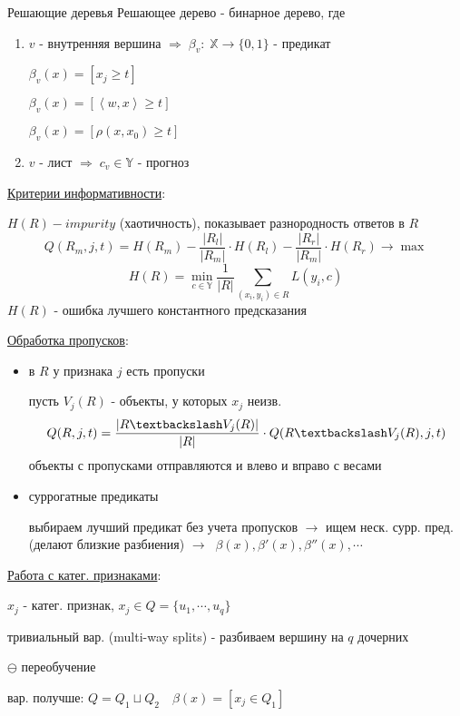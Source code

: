 \documentclass[final]{beamer}
\newlength{\colwidth}
\begin{document}
\begin{frame}[t]
\begin{columns}[t]
\begin{column}{\colwidth}
\begin{block}{Решающие деревья}
{\small Решающее дерево - бинарное дерево, где}
\begin{enumerate}
    \item $v$ - {\small внутренняя вершина } $\Rightarrow \; \beta_v: \; \mathbb{X} \to \{0, 1\}$ - {\small предикат}

$\beta_v(x) = [x_j \ge t]$

$\beta_v(x) = [\left< w, x \right> \ge t]$

$\beta_v(x) = [\rho(x, x_0) \ge t]$
    \item $v$ - {\small лист } $\Rightarrow \; c_v \in \mathbb{Y}$ - {\small прогноз}
\end{enumerate}
{\small \underline{Критерии информативности}:}

$H(R) - impurity$ {\small (хаотичность), показывает разнородность ответов в } $R$
\[Q(R_m, j, t) = H(R_m) - \frac{|R_l|}{|R_m|} \cdot H(R_l) - \frac{|R_r|}{|R_m|} \cdot H(R_r) \to \max\]
\[H(R) = \min\limits_{c \in \mathbb{Y}} \frac{1}{|R|} \sum\limits_{(x_i, y_i) \in R} L(y_i, c)\]
$H(R)$ - {\small ошибка лучшего константного предсказания}

{\small \underline{Обработка пропусков}:}
\begin{itemize}
    \item {\small в } $R$ {\small у признака } $j$ {\small есть пропуски}

{\small пусть } $V_j(R)$ - {\small объекты, у которых } $x_j$ {\small неизв.}
\[Q(R, j, t) = \frac{|R \textbackslash V_j(R)|}{|R|} \cdot Q(R \textbackslash V_j(R), j, t)\]
{\small объекты с пропусками отправляются и влево и вправо с весами}

    \item {\small суррогатные предикаты}

{\small выбираем лучший предикат без учета пропусков } $\to$ {\small ищем неск. сурр. пред. (делают близкие разбиения) } $\to \; \; \beta(x), \beta ' (x), \beta '' (x), \cdots$ 
\end{itemize}

{\small \underline{Работа с катег. признаками}:}

$x_j$ - {\small катег. признак, } $x_j \in Q = \{u_1, \cdots, u_q \}$

{\small тривиальный вар. (multi-way splits) - разбиваем вершину на } $q$ {\small дочерних}

$\ominus$ {\small переобучение}

{\small вар. получше: } $Q = Q_1 \sqcup Q_2 \quad \beta(x) = [x_j \in Q_1]$


\end{block}
\end{column}
\end{columns}
\end{frame}
\end{document}
